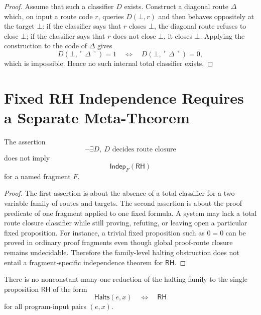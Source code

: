 \begin{proof}
Assume that such a classifier $D$ exists. Construct a diagonal route
$\Delta$ which, on input a route code $r$, queries $D(\bot,r)$ and then
behaves oppositely at the target $\bot$: if the classifier says that $r$
closes $\bot$, the diagonal route refuses to close $\bot$; if the
classifier says that $r$ does not close $\bot$, it closes $\bot$. Applying
the construction to the code of $\Delta$ gives
$$
D(\bot,\ulcorner\Delta\urcorner)=1
\quad\Longleftrightarrow\quad
D(\bot,\ulcorner\Delta\urcorner)=0,
$$
which is impossible. Hence no such internal total classifier exists.
\end{proof}

\section{Fixed RH Independence Requires a Separate Meta-Theorem}
\label{sec:rh-fixed-independence-separate-meta-theorem}

\begin{theorem}
\label{thm:rh-route-undecidability-not-rh-independence}
The assertion
$$
\neg\exists D,\ D\text{ decides route closure}
$$
does not imply
$$
\mathsf{Indep}_{F}(\mathsf{RH})
$$
for a named fragment $F$.
\end{theorem}

\begin{proof}
The first assertion is about the absence of a total classifier for a
two-variable family of routes and targets. The second assertion is about
the proof predicate of one fragment applied to one fixed formula. A system
may lack a total route closure classifier while still proving, refuting, or
leaving open a particular fixed proposition. For instance, a trivial fixed
proposition such as $0=0$ can be proved in ordinary proof fragments even
though global proof-route closure remains undecidable. Therefore the
family-level halting obstruction does not entail a fragment-specific
independence theorem for $\mathsf{RH}$.
\end{proof}

\begin{theorem}
\label{thm:rh-fixed-proposition-not-halting-family}
There is no nonconstant many-one reduction of the halting family to the
single proposition $\mathsf{RH}$ of the form
$$
\mathsf{Halts}(e,x)
\quad\Longleftrightarrow\quad
\mathsf{RH}
$$
for all program-input pairs $(e,x)$.
\end{theorem}

